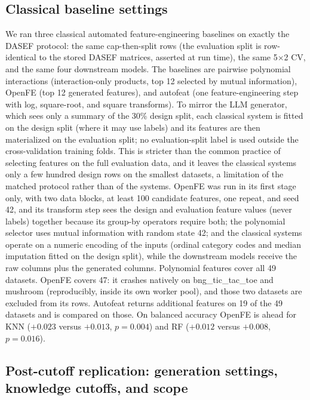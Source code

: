 \subsection*{Classical baseline settings}

We ran three classical automated feature-engineering baselines on exactly the DASEF protocol: the same cap-then-split rows (the evaluation split is row-identical to the stored DASEF matrices, asserted at run time), the same 5\(\times\)2 CV, and the same four downstream models. The baselines are pairwise polynomial interactions (interaction-only products, top 12 selected by mutual information), OpenFE (top 12 generated features), and autofeat (one feature-engineering step with log, square-root, and square transforms). To mirror the LLM generator, which sees only a summary of the 30\% design split, each classical system is fitted on the design split (where it may use labels) and its features are then materialized on the evaluation split; no evaluation-split label is used outside the cross-validation training folds. This is stricter than the common practice of selecting features on the full evaluation data, and it leaves the classical systems only a few hundred design rows on the smallest datasets, a limitation of the matched protocol rather than of the systems. OpenFE was run in its first stage only, with two data blocks, at least 100 candidate features, one repeat, and seed 42, and its transform step sees the design and evaluation feature values (never labels) together because its group-by operators require both; the polynomial selector uses mutual information with random state 42; and the classical systems operate on a numeric encoding of the inputs (ordinal category codes and median imputation fitted on the design split), while the downstream models receive the raw columns plus the generated columns. Polynomial features cover all 49 datasets. OpenFE covers 47: it crashes natively on bng\_tic\_tac\_toe and mushroom (reproducibly, inside its own worker pool), and those two datasets are excluded from its rows. Autofeat returns additional features on 19 of the 49 datasets and is compared on those. On balanced accuracy OpenFE is ahead for KNN (\(+0.023\) versus \(+0.013\), \(p = 0.004\)) and RF (\(+0.012\) versus \(+0.008\), \(p = 0.016\)).

\subsection*{Post-cutoff replication: generation settings, knowledge cutoffs, and scope}

